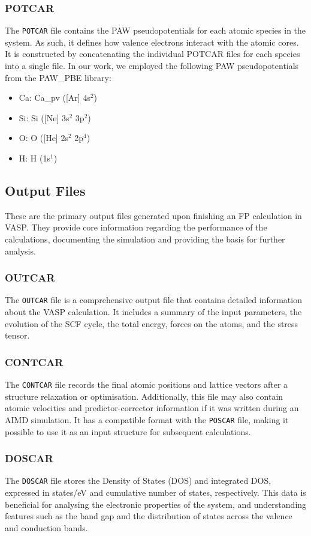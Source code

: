 \subsubsection{POTCAR}
The \texttt{POTCAR} file contains the PAW pseudopotentials for each atomic species in the system. As such, it defines how valence electrons interact with the atomic cores. It is constructed by concatenating the individual POTCAR files for each species into a single file. In our work,  we employed the following PAW pseudopotentials from the PAW\_PBE library:
\begin{itemize}
    \item Ca: Ca\_pv ([Ar] 4s$^2$)
    \item Si: Si ([Ne] 3s$^2$ 3p$^2$)
    \item O: O ([He] 2s$^2$ 2p$^4$)
    \item H: H (1s$^1$)
\end{itemize}

\subsection{Output Files}
These are the primary output files generated upon finishing an FP calculation in VASP. They provide core information regarding the performance of the calculations, documenting the simulation and providing the basis for further analysis.
\subsubsection{OUTCAR}
The \texttt{OUTCAR} file is a comprehensive output file that contains detailed information about the VASP calculation. It includes a summary of the input parameters, the evolution of the SCF cycle, the total energy, forces on the atoms, and the stress tensor.
\subsubsection{CONTCAR}
The \texttt{CONTCAR} file records the final atomic positions and lattice vectors after a structure relaxation or optimisation. Additionally, this file may also contain atomic velocities and predictor-corrector information if it was written during an AIMD simulation. It has a compatible format with the \texttt{POSCAR} file, making it possible to use it as an input structure for subsequent calculations.

\subsubsection{DOSCAR}
The \texttt{DOSCAR} file stores the Density of States (DOS) and integrated DOS, expressed in states/eV and cumulative number of states, respectively. This data is beneficial for analysing the electronic properties of the system, and understanding features such as the band gap and the distribution of states across the valence and conduction bands. 
